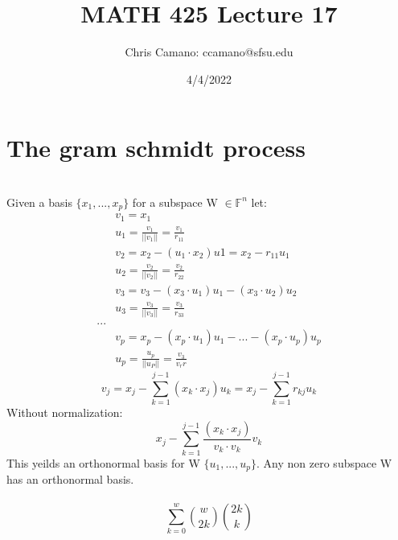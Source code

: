 \documentclass[12pt]{article}
\author{Chris Camano: ccamano@sfsu.edu}
\title{MATH 425  Lecture 17 }
\date{4/4/2022}
\newcommand{\sect}[1]{\section*{#1}}
\newcommand{\F}{\mathbb{F}}
\begin{document}
\maketitle
\sect{The gram schmidt process}\\
Given a basis $\{x_1,...,x_p\}$ for a subspace W $\in \F^n$ let:
\begin{align*}
  &v_1=x_1\\
  & u_1=\frac{v_1}{||v_1||}=\frac{v_1}{r_{11}}\\
  &v_2 =x_2-(u_1\cdot x_2)u1=x_2-r_{11}u_1\\
  &u_2=\frac{v_2}{||v_2||}=\frac{v_2}{r_{22}}\\
  &v_3=v_3-(x_3 \cdot u_1)u_1-(x_3 \cdot u_2 )u_2\\
  &u_3=\frac{v_3}{||v_3||}=\frac{v_3}{r_{33}}\\
  ...\\
  &v_p=x_p-(x_p \cdot u_1)u_1 -...-(x_p \cdot u_p)u_p\\
  &u_p=\frac{u_p}{||u_P||}=\frac{v_3}{v_rr}
\end{align*}
\[
  v_j=x_j-\sum_{k=1}^{j-1}(x_k\cdot x_j)u_k=x_j-\sum_{k=1}^{j-1}r_{kj}u_k
\]
Without normalization:
\[
  x_j-\sum_{k=1}^{j-1}\frac{(x_k\cdot x_j)}{v_k\cdot v_k}v_k
\]
This yeilds an orthonormal basis for W $\{u_1,...,u_p\}$. Any non zero subspace W has an orthonormal basis.\\\\
\[
  \sum_{k=0}^w{w\choose 2k}{2k \choose k}
\]
\end{document}

